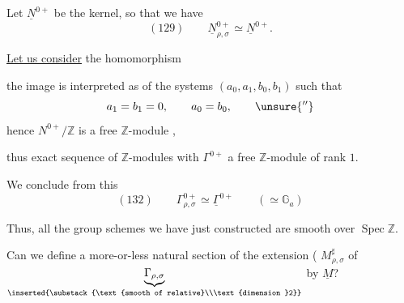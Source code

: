 Let $\underline N^{0+}$ be the kernel, so that we have
\[
(129)\qquad\underline N_{\rho,\sigma}^{0+}\simeq\underline N^{0+}.
\]

\uline{Let us consider} the homomorphism

the image  is interpreted as  of the systems $(a_0,a_1,b_0,b_1)$ such that 
\[
a_1=b_1=0,\qquad a_0=b_0,\qquad\unsure{''}
\]
hence  $N^{0+}/\mathbb Z$ is  a free $\mathbb Z$-module ,


thus  exact sequence of $\mathbb Z$-modules
with $\Gamma^{0+}$ a free $\mathbb Z$-module of rank $1$.

We conclude from this
\[
(132)\qquad\Gamma_{\rho,\sigma}^{0+}\simeq\underline\Gamma^{0+}
\qquad(\simeq\mathbb G_a)
\]

 Thus, all the group schemes we have just constructed are smooth over $\operatorname{Spec}\mathbb Z$.

Can we define a more-or-less natural section of the extension
(
$M_{\rho,\sigma}^{\sharp}$ of
$\underbrace{\Gamma_{\rho,\sigma}}_{\inserted{\substack{\text{smooth of relative}\\\text{dimension }2}}}$
by $\underline M$?

